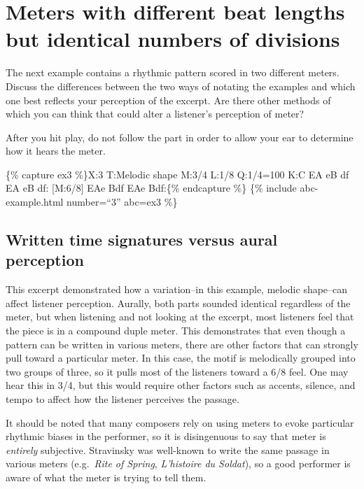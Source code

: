 \documentclass{book}
\begin{document}
\hypertarget{meters-with-different-beat-lengths-but-identical-numbers-of-divisions}{%
\section{Meters with different beat lengths but identical numbers of
divisions}\label{meters-with-different-beat-lengths-but-identical-numbers-of-divisions}}

The next example contains a rhythmic pattern scored in two different meters.
Discuss the differences between the two ways of notating the examples and
which one best reflects your perception of the excerpt. Are there other
methods of which you can think that could alter a listener's perception of
meter?

After you hit play, do not follow the part in order to allow your ear to
determine how it hears the meter.

\{\% capture ex3 \%\}X:3 T:Melodic shape M:3/4 L:1/8 Q:1/4=100 K:C EA eB
df\textbar{} EA eB df:\textbar{} {[}M:6/8{]} EAe Bdf\textbar{} EAe
Bdf:\textbar{]}\{\% endcapture \%\} \{\% include abc-example.html number=``3''
abc=ex3 \%\}

\hypertarget{written-time-signatures-versus-aural-perception}{%
\subsection{Written time signatures versus aural
perception}\label{written-time-signatures-versus-aural-perception}}

This excerpt demonstrated how a variation--in this example, melodic shape--can
affect listener perception. Aurally, both parts sounded identical regardless
of the meter, but when listening and not looking at the excerpt, most
listeners feel that the piece is in a compound duple meter. This demonstrates
that even though a pattern can be written in various meters, there are other
factors that can strongly pull toward a particular meter. In this case, the
motif is melodically grouped into two groups of three, so it pulls most of the
listeners toward a 6/8 feel. One may hear this in 3/4, but this would require
other factors such as accents, silence, and tempo to affect how the listener
perceives the passage.

It should be noted that many composers rely on using meters to evoke
particular rhythmic biases in the performer, so it is disingenuous to say that
meter is \emph{entirely} subjective. Stravinsky was well-known to write the
same passage in various meters (e.g.~\emph{Rite of Spring}, \emph{L'histoire
du Soldat}), so a good performer is aware of what the meter is trying to tell
them.
\end{document}
